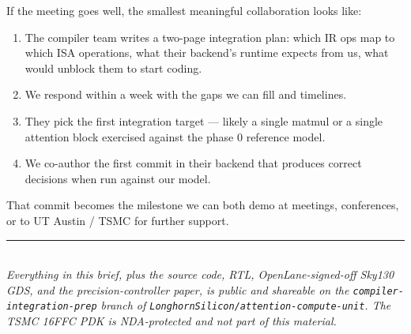 \documentclass[11pt]{article}
\begin{document}
If the meeting goes well, the smallest meaningful collaboration looks like:
\begin{enumerate}
\item The compiler team writes a two-page integration plan: which IR ops
  map to which ISA operations, what their backend's runtime expects from
  us, what would unblock them to start coding.
\item We respond within a week with the gaps we can fill and timelines.
\item They pick the first integration target --- likely a single matmul or
  a single attention block exercised against the phase 0 reference model.
\item We co-author the first commit in their backend that produces correct
  decisions when run against our model.
\end{enumerate}

\noindent
That commit becomes the milestone we can both demo at meetings,
conferences, or to UT Austin / TSMC for further support.

\vspace{0.5em}
\noindent\rule{\textwidth}{0.4pt}\\
\noindent\small\textit{Everything in this brief, plus the source code,
RTL, OpenLane-signed-off Sky130 GDS, and the precision-controller paper, is
public and shareable on the \texttt{compiler-integration-prep} branch of
\texttt{LonghornSilicon/attention-compute-unit}. The TSMC 16FFC PDK
is NDA-protected and not part of this material.}
\end{document}
